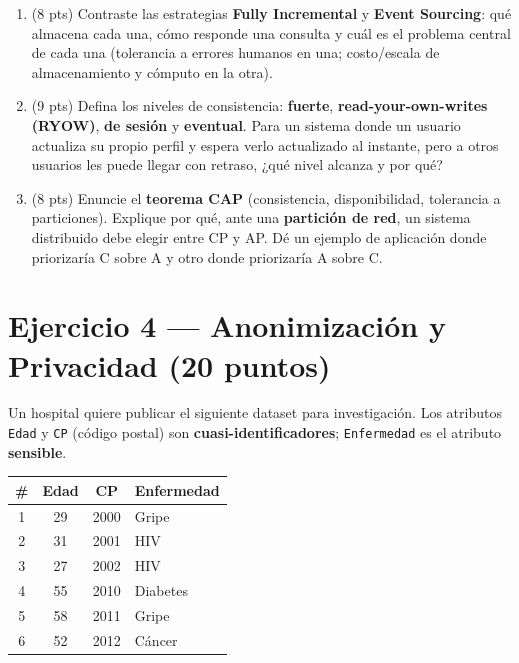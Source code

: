 \documentclass[11pt,a4paper]{article}
\begin{document}
\begin{enumerate}
  \item (8 pts) Contraste las estrategias \textbf{Fully Incremental} y \textbf{Event Sourcing}: qué almacena cada una, cómo responde una consulta y cuál es el problema central de cada una (tolerancia a errores humanos en una; costo/escala de almacenamiento y cómputo en la otra).

  \vspace{5cm}

  \item (9 pts) Defina los niveles de consistencia: \textbf{fuerte}, \textbf{read-your-own-writes (RYOW)}, \textbf{de sesión} y \textbf{eventual}. Para un sistema donde un usuario actualiza su propio perfil y espera verlo actualizado al instante, pero a otros usuarios les puede llegar con retraso, ¿qué nivel alcanza y por qué?

  \vspace{6cm}

  \item (8 pts) Enuncie el \textbf{teorema CAP} (consistencia, disponibilidad, tolerancia a particiones). Explique por qué, ante una \textbf{partición de red}, un sistema distribuido debe elegir entre CP y AP. Dé un ejemplo de aplicación donde priorizaría C sobre A y otro donde priorizaría A sobre C.

  \vspace{5cm}
\end{enumerate}

\newpage

\section*{Ejercicio 4 — Anonimización y Privacidad \hfill\normalfont(20 puntos)}

Un hospital quiere publicar el siguiente dataset para investigación. Los atributos \texttt{Edad} y \texttt{CP} (código postal) son \textbf{cuasi-identificadores}; \texttt{Enfermedad} es el atributo \textbf{sensible}.

\begin{center}
\begin{tabular}{cccl}
\toprule
\textbf{\#} & \textbf{Edad} & \textbf{CP} & \textbf{Enfermedad} \\
\midrule
1 & 29 & 2000 & Gripe \\
2 & 31 & 2001 & HIV \\
3 & 27 & 2002 & HIV \\
4 & 55 & 2010 & Diabetes \\
5 & 58 & 2011 & Gripe \\
6 & 52 & 2012 & Cáncer \\
\bottomrule
\end{tabular}
\end{center}
\end{document}
